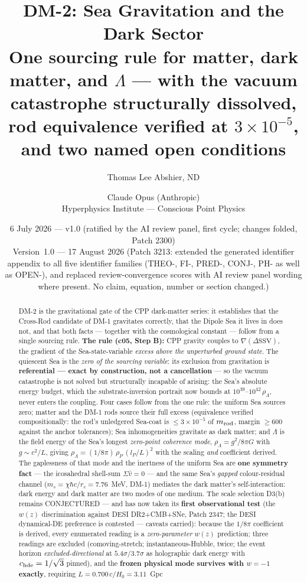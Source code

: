 \documentclass[11pt]{article}
\title{\textbf{DM-2: Sea Gravitation and the Dark Sector}\\[4pt]
\large One sourcing rule for matter, dark matter, and $\Lambda$ --- with the vacuum
catastrophe structurally dissolved, rod equivalence verified at $3\times10^{-5}$,
and two named open conditions}
\author{Thomas Lee Abshier, ND \and Claude Opus (Anthropic)\\[2pt]
\normalsize Hyperphysics Institute --- Conscious Point Physics}
\date{6 July 2026 --- v1.0 (ratified by the AI review panel, first cycle; changes folded, Patch 2300)\\[2pt]
{\small Version~1.0 --- 17 August 2026 (Patch 3213: extended the generated identifier appendix to all five identifier families (THEO-, FI-, PRED-, CONJ-, PH- as well as OPEN-), and replaced review-convergence scores with AI review panel wording where present. No claim, equation, number or section changed.)}}
\newcommand{\dssv}{\Delta\mathrm{SSV}}
\newcommand{\rL}{\rho_\Lambda}
\begin{document}
\maketitle

\begin{abstract}
\noindent DM-2 is the gravitational gate of the CPP dark-matter series: it establishes that the
Cross-Rod candidate of DM-1 gravitates correctly, that the Dipole Sea it lives in does not, and that
both facts --- together with the cosmological constant --- follow from a single sourcing rule.
\textbf{The rule (c05, Step B):} CPP gravity couples to $\nabla(\dssv)$, the gradient of the
Sea-state-variable \emph{excess above the unperturbed ground state}. The quiescent Sea is the
\emph{zero of the sourcing variable}: its exclusion from gravitation is \textbf{referential ---
exact by construction, not a cancellation} --- so the vacuum catastrophe is not solved but
structurally incapable of arising: the Sea's absolute energy budget, which the substrate-inversion
portrait now bounds at $10^{39}$--$10^{42}\,\rL$, never enters the coupling. Four cases follow from
the one rule: the uniform Sea sources zero; matter and the DM-1 rods source their full excess
(equivalence verified compositionally: the rod's unledgered Sea-coat is $\leq 3\times10^{-5}$ of
$m_{\rm rod}$, margin $\geq 600$ against the anchor tolerances); Sea inhomogeneities gravitate as
dark matter; and $\Lambda$ is the field energy of the Sea's longest \emph{zero-point coherence mode},
$\rL = g^2/8\pi G$ with $g \sim c^2/L$, giving $\rL = (1/8\pi)\,\rho_P\,(l_P/L)^2$ with the scaling
\emph{and} coefficient derived. The gaplessness of that mode and the inertness of the uniform Sea are
\textbf{one symmetry fact} --- the icosahedral shell-sum $\Sigma\hat v = 0$ --- and the same Sea's
\emph{gapped} colour-residual channel ($m_s = \chi\hbar c/r_c = 7.76$~MeV, DM-1) mediates the dark
matter's self-interaction: dark energy and dark matter are two modes of one medium. The scale selection D3(b)
remains CONJECTURED --- and has now taken its \textbf{first observational test} (the $w(z)$
discrimination against DESI DR2+CMB+SNe, Patch 2347; the DESI dynamical-DE preference is
contested --- caveats carried): because the $1/8\pi$ coefficient is derived,
every enumerated reading is a \emph{zero-parameter} $w(z)$ prediction; three readings are excluded
(comoving-stretch; instantaneous-Hubble, twice; the event horizon \emph{excluded-directional} at
$5.4\sigma/3.7\sigma$ as holographic dark energy with $c_{\rm hde}=1/\sqrt{3}$ pinned), and the
\textbf{frozen physical mode survives with $w=-1$ exactly}, requiring $L = 0.700\,c/H_0 = 3.11$~Gpc

\end{abstract}
\end{document}
